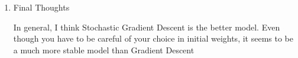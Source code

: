 \documentclass[11pt,letterpaper,oneside]{article}
\numberwithin{equation}{section}
\numberwithin{figure}{section}
\theoremstyle{definition}
\numberwithin{theorem}{section}
\begin{document}
\begin{enumerate}
\begin{enumerate}
\end{enumerate}
\item Final Thoughts

In general, I think Stochastic Gradient Descent is the better model. Even though you have to be careful of your choice in initial weights, it seems to be a much more stable model than Gradient Descent
\end{enumerate}
\end{document}
